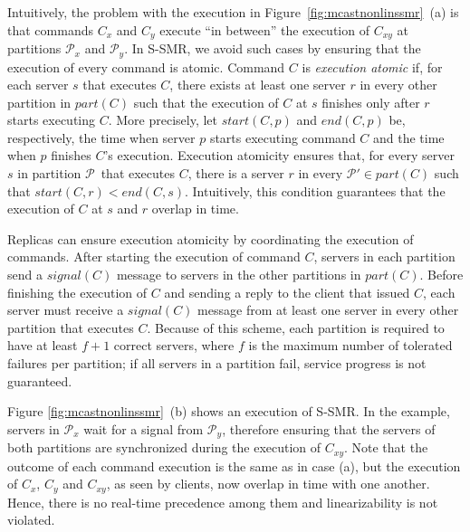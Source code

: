 \documentclass[11pt]{article}
\newcommand{\pp}{$\mathcal{P}$}
\newcommand{\ppm}{\mathcal{P}}
\begin{document}
Intuitively, the problem with the execution in Figure~\ref{fig:mcastnonlinssmr}~(a) is that commands $C_x$ and $C_y$ execute ``in between'' the execution of $C_{xy}$ at partitions $\ppm_x$ and $\ppm_y$.
In S-SMR, we avoid such cases by ensuring that the execution of every command is atomic.
%
Command $C$ is \emph{execution atomic} if, for each server $s$ that executes $C$, there exists at least one server $r$ in every other partition in $part(C)$ such that the execution of $C$ at $s$ finishes only after $r$ starts executing $C$.
%
More precisely, let $start(C,p)$ and $end(C,p)$ be, respectively, the time when server $p$ starts executing command $C$ and the time when $p$ finishes $C$'s execution.
Execution atomicity ensures that, for every server $s$ in partition \pp\ that executes $C$, there is a server $r$ in every $\ppm' \in part(C)$ such that \mbox{$start(C,r) < end(C,s)$}.
Intuitively, this condition guarantees that the execution of $C$ at $s$ and $r$ overlap in time.


Replicas can ensure execution atomicity by coordinating the execution of commands.
After starting the execution of command $C$, servers in each partition send a $signal(C)$ message to servers in the other partitions in $part(C)$.
Before finishing the execution of $C$ and sending a reply to the client that issued $C$, each server must receive a $signal(C)$ message from at least one server in every other partition that executes $C$.
Because of this scheme, each partition is required to have at least $f+1$ correct servers, where $f$ is the maximum number of tolerated failures per partition; if all servers in a partition fail, service progress is not guaranteed.

Figure \ref{fig:mcastnonlinssmr}~(b) shows an execution of S-SMR.
In the example, servers in $\ppm_x$ wait for a signal from $\ppm_y$,
therefore ensuring that the servers of both partitions are synchronized during the execution of $C_{xy}$.
Note that the outcome of each command execution is the same as in case (a), but the execution of $C_x$, $C_y$ and $C_{xy}$, as seen by clients, now overlap in time with one another.
Hence, there is no real-time precedence among them and linearizability is not violated.
\end{document}

